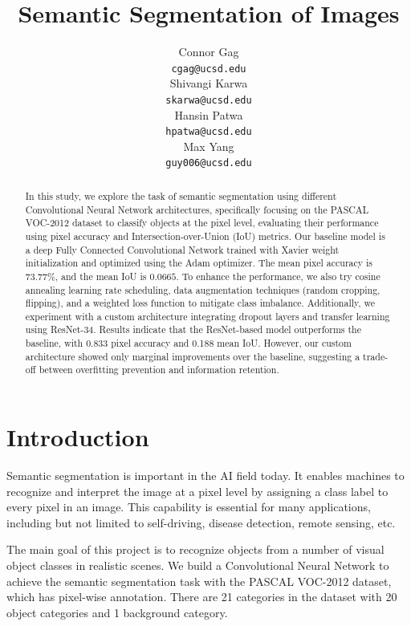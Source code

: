 \documentclass{article}
\title{Semantic Segmentation of Images}
\author{
  Connor Gag \\
  \texttt{cgag@ucsd.edu} \\
  \And
  Shivangi Karwa \\
  \texttt{skarwa@ucsd.edu} \\
  \And
  Hansin Patwa \\
  \texttt{hpatwa@ucsd.edu} \\
  \And
  Max Yang \\ 
  \texttt{guy006@ucsd.edu}
}
\begin{document}
\maketitle

\begin{abstract}
In this study, we explore the task of semantic segmentation using different Convolutional Neural Network architectures, specifically focusing on the PASCAL VOC-2012 dataset to classify objects at the pixel level, evaluating their performance using pixel accuracy and Intersection-over-Union (IoU) metrics. Our baseline model is a deep Fully Connected Convolutional Network trained with Xavier weight initialization and optimized using the Adam optimizer. The mean pixel accuracy is $73.77\%$, and the mean IoU is $0.0665$. To enhance the performance, we also try cosine annealing learning rate scheduling, data augmentation techniques (random cropping, flipping), and a weighted loss function to mitigate class imbalance. Additionally, we experiment with a custom architecture integrating dropout layers and transfer learning using ResNet-34. Results indicate that the ResNet-based model outperforms the baseline, with 0.833 pixel accuracy and 0.188 mean IoU. However, our custom architecture showed only marginal improvements over the baseline, suggesting a trade-off between overfitting prevention and information retention.
\end{abstract}

\section{Introduction}
Semantic segmentation is important in the AI field today. It enables machines to recognize and interpret the image at a pixel level by assigning a class label to every pixel in an image. This capability is essential for many applications, including but not limited to self-driving, disease detection, remote sensing, etc. 

The main goal of this project is to recognize objects from a number of visual object classes in realistic scenes. We build a Convolutional Neural Network to achieve the semantic segmentation task with the PASCAL VOC-2012 dataset, which has pixel-wise annotation. There are 21 categories in the dataset with 20 object categories and 1 background category.
\end{document}
